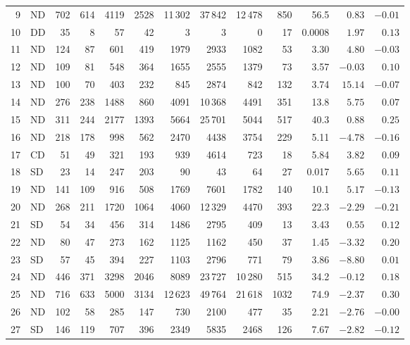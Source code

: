 \documentclass[11pt,a4paper]{article}
\begin{document}
\begin{longtable}{rlrrrrrrrrrrr}
 9 & ND & 702 & 614 & 4119 & 2528 & 11\,302 & 37\,842 & 12\,478 &  850 & 56.5  &  $0.83$ & $-0.01$ \\
10 & DD &  35 &   8 &   57 &   42 &     3 &     3 &     0 &   17 &  0.0008 & $1.97$ &  $0.13$ \\
11 & ND & 124 &  87 &  601 &  419 &  1979 &  2933 &  1082 &   53 &  3.30 &  $4.80$ & $-0.03$ \\
12 & ND & 109 &  81 &  548 &  364 &  1655 &  2555 &  1379 &   73 &  3.57 & $-0.03$ &  $0.10$ \\
13 & ND & 100 &  70 &  403 &  232 &   845 &  2874 &   842 &  132 &  3.74 & $15.14$ & $-0.07$ \\
14 & ND & 276 & 238 & 1488 &  860 &  4091 & 10\,368 &  4491 &  351 & 13.8  &  $5.75$ &  $0.07$ \\
15 & ND & 311 & 244 & 2177 & 1393 &  5664 & 25\,701 &  5044 &  517 & 40.3  &  $0.88$ &  $0.25$ \\
16 & ND & 218 & 178 &  998 &  562 &  2470 &  4438 &  3754 &  229 &  5.11 & $-4.78$ & $-0.16$ \\
17 & CD &  51 &  49 &  321 &  193 &   939 &  4614 &   723 &   18 &  5.84 &  $3.82$ &  $0.09$ \\
18 & SD &  23 &  14 &  247 &  203 &    90 &    43 &    64 &   27 &  0.017 & $5.65$ &  $0.11$ \\
19 & ND & 141 & 109 &  916 &  508 &  1769 &  7601 &  1782 &  140 & 10.1  &  $5.17$ & $-0.13$ \\
20 & ND & 268 & 211 & 1720 & 1064 &  4060 & 12\,329 &  4470 &  393 & 22.3  & $-2.29$ & $-0.21$ \\
21 & SD &  54 &  34 &  456 &  314 &  1486 &  2795 &   409 &   13 &  3.43 &  $0.55$ &  $0.12$ \\
22 & ND &  80 &  47 &  273 &  162 &  1125 &  1162 &   450 &   37 &  1.45 & $-3.32$ &  $0.20$ \\
23 & SD &  57 &  45 &  394 &  227 &  1103 &  2796 &   771 &   79 &  3.86 & $-8.80$ &  $0.01$ \\
24 & ND & 446 & 371 & 3298 & 2046 &  8089 & 23\,727 & 10\,280 &  515 & 34.2  & $-0.12$ &  $0.18$ \\
25 & ND & 716 & 633 & 5000 & 3134 & 12\,623 & 49\,764 & 21\,618 & 1032 & 74.9  & $-2.37$ &  $0.30$ \\
26 & ND & 102 &  58 &  285 &  147 &   730 &  2100 &   477 &   35 &  2.21 & $-2.76$ & $-0.00$ \\
27 & SD & 146 & 119 &  707 &  396 &  2349 &  5835 &  2468 &  126 &  7.67 & $-2.82$ & $-0.12$ \\

\end{longtable}
\end{document}
